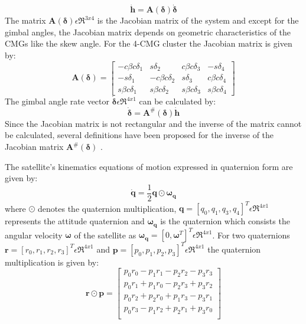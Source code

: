 \documentclass[journal]{new-aiaa}
\begin{document}
\begin{equation}
   \dot{ \textbf{h}}=\textbf{A}(\boldsymbol{\delta})\dot{\boldsymbol{\delta}}
\end{equation}
The matrix $\textbf{A}(\boldsymbol{\delta})\epsilon\Re^{3x4} $ is the Jacobian matrix of the system and except for the gimbal angles, the Jacobian matrix depends on geometric characteristics of the CMGs like the skew angle. For the 4-CMG cluster the Jacobian matrix is given by:
\begin{equation}
\textbf{A}(\boldsymbol{\delta})=
\begin{bmatrix}
-c\beta c\delta_{1} & s\delta_{2} & c\beta c\delta_{3} & -s\delta_{4}\\
-s\delta_{1} & -c\beta c\delta_{2} & s\delta_{3} & c\beta c\delta_{4}\\
s\beta c\delta_{1} & s\beta c\delta_{2} & s\beta c\delta_{3} & s\beta c\delta_{4}
\end{bmatrix}
\end{equation}The gimbal angle rate vector $\boldsymbol{\dot{\delta}}\epsilon\Re^{4x1}$ can be calculated by:
\begin{equation}
\label{eq:inverse}
   \dot{\boldsymbol{\delta}}=\textbf{A}^{\#}(\boldsymbol{\delta}) \dot{ \textbf{h}}
\end{equation}
Since the Jacobian matrix is not rectangular and the inverse of the matrix cannot be calculated, several definitions have been proposed for the inverse of the Jacobian matrix $\textbf{A}^{\#}(\boldsymbol{\delta})$ \cite{generalized_inverse_book,nak_advanced_robotics}.

The satellite's kinematics equations of motion expressed in quaternion form are given by:
\begin{equation}
\dot{\textbf{q}}=\frac{1}{2}\textbf{q}\odot\boldsymbol{\omega_q}
\label{eq:quaternion_dot}
\end{equation}
where $\odot$ denotes the quaternion multiplication, $\textbf{q}=[q_0, q_1, q_3, q_4]^T\epsilon\Re^{4x1}$ represents the attitude quaternion and $\boldsymbol{\omega_q}$ is the quaternion which consists the angular velocity $\boldsymbol{\omega}$ of the satellite as  $\boldsymbol{\omega_q}=[0,\boldsymbol{\omega}^T]^T\epsilon\Re^{4x1}$. For two quaternions $\textbf{r}=[r_0,r_1,r_2,r_3]^T\epsilon\Re^{4x1}$ and $\textbf{p}=[p_0,p_1,p_2,p_3]^T\epsilon\Re^{4x1}$ the quaternion multiplication is given by:
\begin{equation}
\textbf{r} \odot \textbf{p} =
\begin{bmatrix}
p_0r_0 - p_1r_1 - p_2r_2 - p_3r_3\\
 p_0r_1 + p_1r_0 - p_2r_3 + p_3r_2\\
 p_0r_2 + p_2r_0 + p_1r_3 - p_3r_1\\
 p_0r_3 - p_1r_2 + p_2r_1 + p_3r_0\\
\end{bmatrix}
\end{equation}
\end{document}

